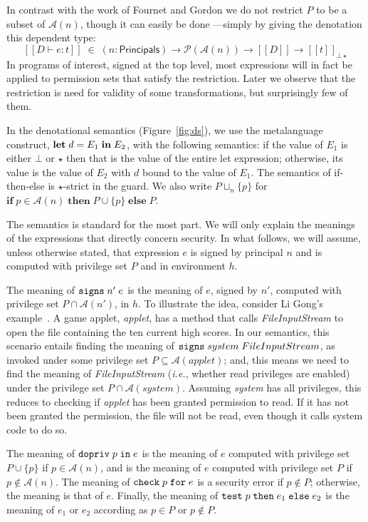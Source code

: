 \documentclass[submission,copyright,creativecommons]{eptcs}
\newcommand{\ie}{{\em i.e.}}
\newcommand{\mletml}[3]{\MLET\;#1=#2\;\MIN\;#3}
\newcommand{\mifthenelse}[3]{\MIF\;#1\;\MTHEN\;#2\;\MELSE\;#3}
\newcommand{\enable}[2]{\ENABLE\;#1\;\IN\;#2}
\newcommand{\chk}[2]{\CHK\;#1\;\FOR\;#2}
\newcommand{\test}[3]{\TEST\;#1\;\THEN\;#2\;\ELSE\;#3}
\newcommand{\signs}[2]{\SIGNS\;#1\;#2}
\newcommand{\ELSE}{\mbox{\texttt{else}}}
\newcommand{\FOR}{\mbox{\texttt{for}}}
\newcommand{\IN}{\mbox{\texttt{in}}}
\newcommand{\MIN}{\mbox{\textbf{in}}}
\newcommand{\MLET}{\mbox{\textbf{let}}}
\newcommand{\THEN}{{\texttt{then}}}
\newcommand{\MTHEN}{{\textbf{then}}}
\newcommand{\MELSE}{{\textbf{else}}}
\newcommand{\MIF}{{\textbf{if}}}
\newcommand{\A}{\mathcal{A}}
\renewcommand{\P}{\mathcal{P}}
\newcommand{\ldb}{[\![}
\newcommand{\rdb}{]\!]}
\newcommand{\means}[1]{\ldb {#1}\rdb}
\newcommand{\union}{\cup}
\newcommand{\intersect}{\cap}
\newcommand{\proves}{\vdash}
\newcommand{\PRINC}{{\mathsf{Principals}}}
\newcommand{\ENABLE}{\mbox{\texttt{dopriv}}}
\newcommand{\CHK}{\mbox{\texttt{check}}}
\newcommand{\TEST}{\mbox{\texttt{test}}}
\newcommand{\SIGNS}{\mbox{\texttt{signs}}}
\newcommand{\D}{D} \newcommand{\ty}{t} \renewcommand{\th}{\theta}
\newcommand{\n}{n} \newcommand{\p}{p} \newcommand{\Ps}{\Pi} \newcommand{\h}{h}
\begin{document}
In contrast with the work of Fournet and Gordon we do not restrict $P$ to be a subset of $\A(n)$,
though it can easily be done ---simply by giving the denotation this dependent type:
\begin{equation}\label{eq:dependDenot}
\means{\D\proves e:\ty} \; \in \; (\n:\PRINC)\to\P(\A(\n))\to\means{\D}\to\means{\ty}_{\bot\star}
\end{equation}
In programs of interest, signed at the top level, most expressions will in fact be applied to permission sets that satisfy the restriction. 
Later we observe that the restriction is need for validity of some transformations, but surprisingly few of them.  



In the denotational semantics (Figure~\ref{fig:ds}), we use the metalanguage 
construct, $\mletml{d}{E_1}{E_2}$, with the following semantics: if the value 
of $E_1$ is either $\bot$ or $\star$ then that is the value of the entire let 
expression; otherwise, its value is the value of $E_2$ with $d$ bound to
the value of $E_1$. 
The semantics of if-then-else is $\star$-strict in the guard.
We also write $P\sqcup_{\n}\{\p\}$ for 
$\mifthenelse{\p\in\A(\n)}{P\union\{\p\}}{P}$.

The semantics is standard for the most part. We will only explain the
meanings of the expressions that directly concern security. In what follows,
we will assume, unless otherwise stated, that expression $e$ is signed by 
principal $\n$ and is computed with privilege set $P$ and in environment $\h$.

The meaning of $\signs{\n'}{e}$ is the meaning of $e$, signed by
$\n'$, computed with privilege set $P\intersect\A(\n')$, in $\h$. 
To illustrate the idea, consider Li Gong's
example~\cite[Section 3.11.2]{Gong99}. A game applet, \textit{applet},
has a method that calls \textit{FileInputStream} to open the file containing
the ten current high scores. In our semantics, this scenario entails finding
the meaning of $\signs{system}{FileInputStream}$, as invoked under some privilege set $P \subseteq\A(applet)$; and, this means we need to
find the meaning of \textit{FileInputStream} (\ie, whether read privileges
are enabled) under the privilege set $P\intersect\A(system)$. Assuming 
\textit{system} has all privileges, this reduces to checking if 
\textit{applet} has been granted permission to read. If it has not been granted
the permission, the file will not be read, even though it calls system code
to do so.

The meaning of $\enable{\p}{e}$ is the meaning of
$e$ computed with privilege set $P\union\{\p\}$ if $\p\in\A(\n)$, and is the 
meaning of $e$ computed with privilege set $P$ if $\p\not\in\A(\n)$. 
The meaning of $\chk{\p}{e}$ is a security error if $\p\not\in P$; otherwise, 
the meaning is that of $e$. Finally, the meaning of $\test{\p}{e_1}{e_2}$
is the meaning of $e_1$ or $e_2$ according as $\p\in P$ or $\p\not\in P$.
\end{document}
